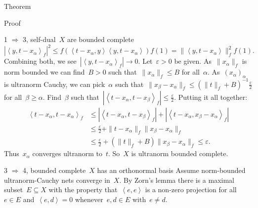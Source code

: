 \documentclass[b]{subfiles}
\begin{document}
\begin{parsec}
\begin{point}{Theorem}
\begin{point}{Proof}
\begin{point}{1 $\Rightarrow$ 3, self-dual~$X$ are bounded complete}
\begin{equation*}
    |\left<y,t-x_\alpha\right>_f|^2
    \leq f( \left<t-x_\alpha,y\right> \left<y,t-x_\alpha\right>) f(1)
    = \| \left<y,t-x_\alpha\right> \|_f^2 f(1).
\end{equation*}
Combining both, we see~$|\left<y,t-x_\alpha\right>_f| \rightarrow 0$.
Let~$\varepsilon > 0$ be given.
As~$\|x_\alpha\|_f$ is norm bounded
we can find~$B > 0$ such that~$\|x_\alpha\|_f \leq B$
for all~$\alpha$.
As~$(x_\alpha)_\alpha$ is ultranorm Cauchy,
we can pick~$\alpha$ such that~$\|x_\beta - x_\alpha\|_f \leq (\|t\|_f + B)^{-1}
\frac{\varepsilon}{2}$ for all~$\beta \geq \alpha$.
Find~$\beta$ such that~$|\left<t-x_\alpha,t-x_\beta\right>_f|
    \leq \frac{\varepsilon}{2}$.
Putting it all together:
\begin{align*}
    \left<t-x_\alpha,t-x_\alpha\right>_f
    & \leq |\left<t-x_\alpha,t-x_\beta\right>_f|
    + |\left<t-x_\alpha,x_\beta-x_\alpha\right>_f| \\
    & \leq \frac{\varepsilon}{2}
    + \| t- x_\alpha \|_f \|x_\beta - x_\alpha\|_f\\
    & \leq \frac{\varepsilon}{2}
    + (\| t\|_f + B) \|x_\beta - x_\alpha\|_f \leq \varepsilon.
\end{align*}
Thus~$x_\alpha$ converges ultranorm to~$t$.
So~$X$ is ultranorm bounded complete.
\end{point}
\begin{point}{3
    $\Rightarrow$ 4, bounded complete~$X$ has an orthonormal basis}
    Assume norm-bounded ultranorm-Cauchy nets converge in~$X$.
By Zorn's lemma there is a maximal subset~$E \subseteq X$
    with the property that~$\left<e,e\right>$ is a non-zero projection
    for all~$e\in E$
    and~$\left<e,d\right>=0$ whenever~$e,d \in E$ with~$e \neq d$.


\end{point}
\end{point}
\end{point}
\end{parsec}
\end{document}
